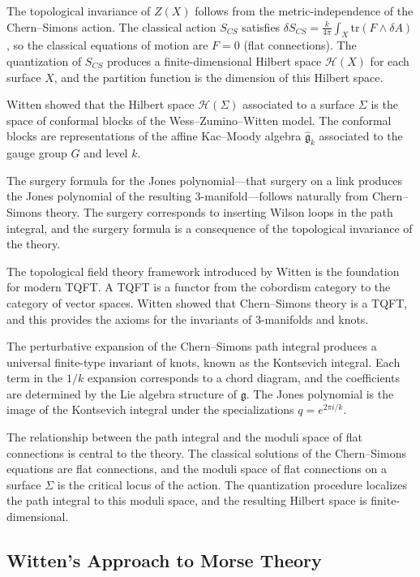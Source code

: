The topological invariance of $Z(X)$ follows from the metric-independence of the Chern--Simons action. The classical action $S_{CS}$ satisfies $\delta S_{CS} = \frac{k}{4\pi}\int_X \text{tr}(F \wedge \delta A)$, so the classical equations of motion are $F = 0$ (flat connections). The quantization of $S_{CS}$ produces a finite-dimensional Hilbert space $\mathcal{H}(X)$ for each surface $X$, and the partition function is the dimension of this Hilbert space.

Witten showed that the Hilbert space $\mathcal{H}(\Sigma)$ associated to a surface $\Sigma$ is the space of conformal blocks of the Wess--Zumino--Witten model. The conformal blocks are representations of the affine Kac--Moody algebra $\widehat{\mathfrak{g}}_k$ associated to the gauge group $G$ and level $k$.

The surgery formula for the Jones polynomial---that surgery on a link produces the Jones polynomial of the resulting 3-manifold---follows naturally from Chern--Simons theory. The surgery corresponds to inserting Wilson loops in the path integral, and the surgery formula is a consequence of the topological invariance of the theory.

The topological field theory framework introduced by Witten is the foundation for modern TQFT. A TQFT is a functor from the cobordism category to the category of vector spaces. Witten showed that Chern--Simons theory is a TQFT, and this provides the axioms for the invariants of 3-manifolds and knots.

The perturbative expansion of the Chern--Simons path integral produces a universal finite-type invariant of knots, known as the Kontsevich integral. Each term in the $1/k$ expansion corresponds to a chord diagram, and the coefficients are determined by the Lie algebra structure of $\mathfrak{g}$. The Jones polynomial is the image of the Kontsevich integral under the specializations $q = e^{2\pi i/k}$.

The relationship between the path integral and the moduli space of flat connections is central to the theory. The classical solutions of the Chern--Simons equations are flat connections, and the moduli space of flat connections on a surface $\Sigma$ is the critical locus of the action. The quantization procedure localizes the path integral to this moduli space, and the resulting Hilbert space is finite-dimensional.

\subsection{Witten's Approach to Morse Theory}

